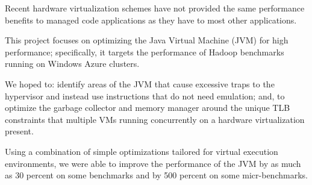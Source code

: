% 
% 
%

Recent hardware virtualization schemes have not provided the same
performance benefits to managed code applications as they have to most other
applications. 

This project focuses on optimizing the Java Virtual Machine (JVM)
for high performance; specifically, it targets the performance of 
Hadoop benchmarks running on Windows Azure clusters. 

We hoped to: identify areas of the
JVM that cause excessive traps to the hypervisor and instead use
instructions that do not need emulation; and, to optimize the garbage
collector and memory manager around the unique TLB constraints that
multiple VMs running concurrently on a hardware virtualization present.

Using a combination of simple optimizations tailored for virtual
execution environments, we were able to improve the 
performance of the JVM by as much as 30 percent on some benchmarks
and by 500 percent on some micr-benchmarks.

